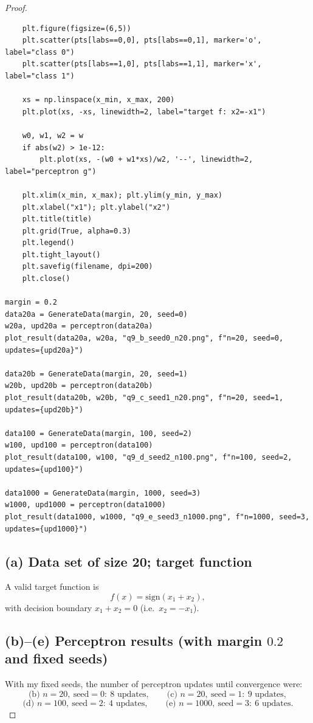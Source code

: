 \documentclass[en,hazy,blue,12pt,normal]{elegantnote}
\begin{document}
\begin{proof}
\begin{verbatim}
    plt.figure(figsize=(6,5))
    plt.scatter(pts[labs==0,0], pts[labs==0,1], marker='o', label="class 0")
    plt.scatter(pts[labs==1,0], pts[labs==1,1], marker='x', label="class 1")

    xs = np.linspace(x_min, x_max, 200)
    plt.plot(xs, -xs, linewidth=2, label="target f: x2=-x1")

    w0, w1, w2 = w
    if abs(w2) > 1e-12:
        plt.plot(xs, -(w0 + w1*xs)/w2, '--', linewidth=2, label="perceptron g")

    plt.xlim(x_min, x_max); plt.ylim(y_min, y_max)
    plt.xlabel("x1"); plt.ylabel("x2")
    plt.title(title)
    plt.grid(True, alpha=0.3)
    plt.legend()
    plt.tight_layout()
    plt.savefig(filename, dpi=200)
    plt.close()

margin = 0.2
data20a = GenerateData(margin, 20, seed=0)
w20a, upd20a = perceptron(data20a)
plot_result(data20a, w20a, "q9_b_seed0_n20.png", f"n=20, seed=0, updates={upd20a}")

data20b = GenerateData(margin, 20, seed=1)
w20b, upd20b = perceptron(data20b)
plot_result(data20b, w20b, "q9_c_seed1_n20.png", f"n=20, seed=1, updates={upd20b}")

data100 = GenerateData(margin, 100, seed=2)
w100, upd100 = perceptron(data100)
plot_result(data100, w100, "q9_d_seed2_n100.png", f"n=100, seed=2, updates={upd100}")

data1000 = GenerateData(margin, 1000, seed=3)
w1000, upd1000 = perceptron(data1000)
plot_result(data1000, w1000, "q9_e_seed3_n1000.png", f"n=1000, seed=3, updates={upd1000}")
\end{verbatim}

\subsection*{(a) Data set of size 20; target function}
A valid target function is
\[
f(x)=\mathrm{sign}(x_1+x_2),
\]
with decision boundary $x_1+x_2=0$ (i.e.\ $x_2=-x_1$).

\subsection*{(b)--(e) Perceptron results (with margin $0.2$ and fixed seeds)}
With my fixed seeds, the number of perceptron updates until convergence were:
\[
\text{(b) } n=20,\ \text{seed}=0:\ 8 \text{ updates},\qquad
\text{(c) } n=20,\ \text{seed}=1:\ 9 \text{ updates},
\]
\[
\text{(d) } n=100,\ \text{seed}=2:\ 4 \text{ updates},\qquad
\text{(e) } n=1000,\ \text{seed}=3:\ 6 \text{ updates}.
\]


\end{proof}
\end{document}
